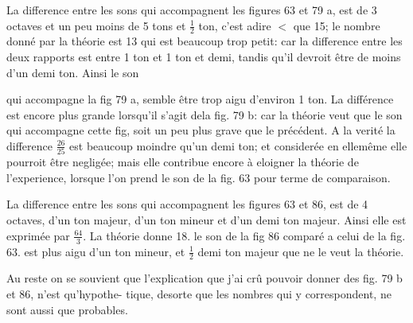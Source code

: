 \documentclass[11pt,a4paper]{article}
\begin{document}
La difference entre les sons qui accompagnent les figures 63 et
79 a, est de 3 octaves et un peu moins de 5 tons et $\frac{1}{2}$ ton,
c'est adire $<$ que 15; le nombre donné par la théorie est 13
qui est beaucoup trop petit: car la difference entre les deux rapports
est  entre 1 ton et 1 ton et demi, tandis
qu'il devroit être de moins d'un demi ton. Ainsi le son


qui accompagne la fig 79 a, semble être trop aigu d'environ 1 ton.
La différence est encore plus grande lorsqu'il s'agit dela fig. 79 b:
car la théorie veut que le son qui accompagne cette fig, soit
un peu plus grave que le précédent. A la verité la difference
 $\frac{26}{25}$ est beaucoup moindre qu'un demi ton; et considerée
en ellemême elle pourroit être negligée; mais elle contribue
encore à eloigner la théorie de l'experience, lorsque l'on
prend le son de la fig. 63 pour terme de comparaison.

La difference entre les sons qui accompagnent les figures
63 et 86, est de 4 octaves,  d'un ton majeur, d'un ton
mineur et d'un demi ton \struck{\ill{}} majeur. Ainsi elle est exprimée
par $\frac{64}{3}$. La théorie donne 18.  le son 
de la fig 86 comparé a celui de la fig. 63. est  plus
aigu d'un ton mineur, et $\frac{1}{2}$ demi ton majeur que ne le
veut la théorie.

Au reste on se souvient que l'explication que j'ai
crû pouvoir donner des fig. 79 b et 86, n'est qu'hypothe-
tique, desorte que les nombres qui y correspondent,
ne sont aussi que probables.
\end{document}
